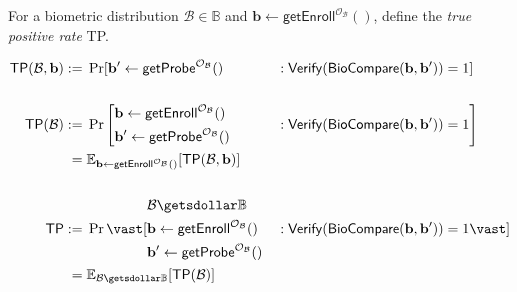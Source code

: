 \begin{definition}
For a biometric distribution $\mathcal{B} \in \mathbb{B}$ and $\mathbf{b} \gets \mathsf{getEnroll}^{\mathcal{O}_\mathcal{B}}()$, define the \emph{true positive rate} \textsf{TP}.

\begin{alignat*}{2}
	\mathsf{TP}(\mathcal{B}, \mathbf{b}) 
	:=&\; \Pr[ \mathbf{b}^\prime \gets \mathsf{getProbe}^{\mathcal{O}_\mathcal{B}}()
	&&: \mathsf{Verify}(\mathsf{BioCompare}(\mathbf{b}, \mathbf{b}^\prime )) = 1 ] \\
	\\
	\mathsf{TP}(\mathcal{B}) 
	:=&\; \Pr \Bigg[ 
		\begin{aligned}	
			& \mathbf{b} \gets \mathsf{getEnroll}^{\mathcal{O}_\mathcal{B}}() \\
			& \mathbf{b}^\prime \gets \mathsf{getProbe}^{\mathcal{O}_\mathcal{B}}()
		\end{aligned}
		&&: \mathsf{Verify}(\mathsf{BioCompare}(\mathbf{b}, \mathbf{b}^\prime)) = 1 \Bigg] \\
	=&\; \mathbb{E}_{ \mathbf{b} \gets \mathsf{getEnroll}^{\mathcal{O}_\mathcal{B}}() }[\mathsf{TP}(\mathcal{B}, \mathbf{b})] \\
	\\
	\mathsf{TP} 
	:=&\; \Pr \vast[
		\begin{aligned}
			& \mathcal{B} \getsdollar \mathbb{B} \\
			& \mathbf{b} \gets \mathsf{getEnroll}^{\mathcal{O}_\mathcal{B} }() \\
			& \mathbf{b}^\prime \gets \mathsf{getProbe}^{\mathcal{O}_\mathcal{B} }()
		\end{aligned}
		&&: \mathsf{Verify}(\mathsf{BioCompare}(\mathbf{b}, \mathbf{b}^\prime )) = 1 \vast] \\
	=&\; \mathbb{E}_{\mathcal{B} \getsdollar \mathbb{B}}[\mathsf{TP}(\mathcal{B})] 
\end{alignat*}

\end{definition}


